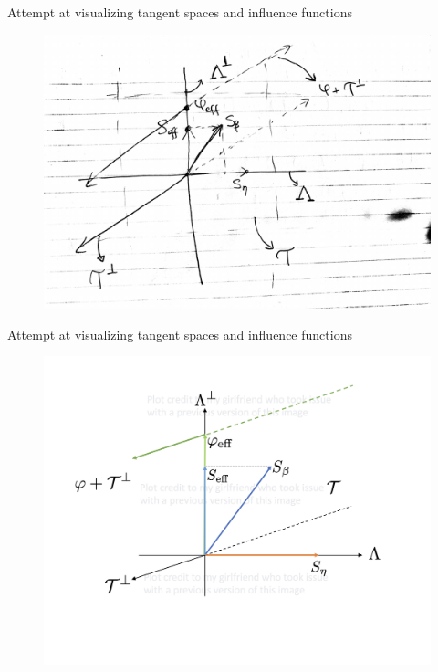 \documentclass[10pt,aspectratio=169,handout]{beamer}
\theoremstyle{definition}
\begin{document}
\begin{frame}{Attempt at visualizing tangent spaces and influence
functions}
  \begin{figure}[tb]
    \centering
    \includegraphics[height=0.8\textheight]{viz.pdf}
    \label{fig:figure1}
  \end{figure}
\end{frame}

\begin{frame}{Attempt at visualizing tangent spaces and influence
functions}
  \begin{figure}[tb]
    \centering
    \includegraphics[height=0.9\textheight]{viz2.png}
    \label{fig:figure1}
  \end{figure}
\end{frame}
\end{document}
